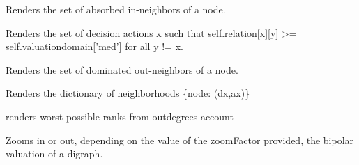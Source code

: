 \documentclass[letterpaper,10pt,english]{sphinxmanual}
\begin{document}
\begin{fulllineitems}

\begin{fulllineitems}
\label{techDoc:digraphs.Digraph.weakAneighbors}
Renders the set of absorbed in-neighbors of a node.

\end{fulllineitems}


\begin{fulllineitems}
\label{techDoc:digraphs.Digraph.weakCondorcetWinners}
Renders the set of decision actions x such that
self.relation{[}x{]}{[}y{]} \textgreater{}= self.valuationdomain{[}'med'{]}
for all y != x.

\end{fulllineitems}


\begin{fulllineitems}
\label{techDoc:digraphs.Digraph.weakDneighbors}
Renders the set of dominated out-neighbors of a node.

\end{fulllineitems}


\begin{fulllineitems}
\label{techDoc:digraphs.Digraph.weakGammaSets}
Renders the dictionary of neighborhoods \{node: (dx,ax)\}

\end{fulllineitems}


\begin{fulllineitems}
\label{techDoc:digraphs.Digraph.worstRanks}
renders worst possible ranks from outdegrees account

\end{fulllineitems}


\begin{fulllineitems}
\label{techDoc:digraphs.Digraph.zoomValuation}
Zooms in or out, depending on the value of the zoomFactor provided,
the bipolar valuation of a digraph.

\end{fulllineitems}


\end{fulllineitems}
\end{document}
